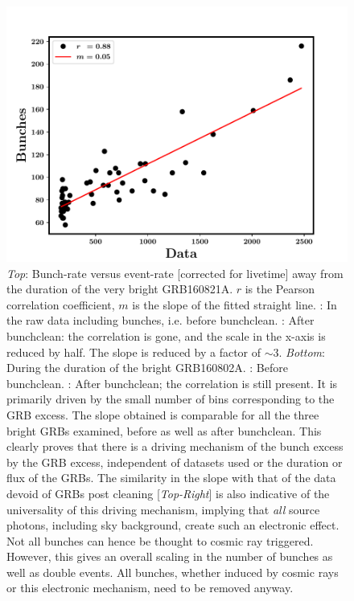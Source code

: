 \begin{figure}
\begin{center}
\includegraphics[scale=0.4]{GRB160802A--GRB_fit--with_Bunchclean}
\caption[Correlation between bunch-rate and event-rate]{\emph{Top}: Bunch-rate versus event-rate [corrected for livetime] away from the duration of the very bright GRB160821A. $r$ is the Pearson correlation coefficient, $m$ is the slope of the fitted straight line. \eL: In the raw data including bunches, i.e. before bunchclean. \eR: After bunchclean: the correlation is gone, and the scale in the x-axis is reduced by half. The slope is reduced by a factor of $\sim 3$. \emph{Bottom}: During the duration of the bright GRB160802A. \eL: Before bunchclean. \eR: After bunchclean; the correlation is still present. It is primarily driven by the small number of bins corresponding to the GRB excess. The slope obtained is comparable for all the three bright GRBs examined, before as well as after bunchclean. This clearly proves that there is a driving mechanism of the bunch excess by the GRB excess, independent of datasets used or the duration or flux of the GRBs. The similarity in the slope with that of the data devoid of GRBs post cleaning [\emph{Top-Right}] is also indicative of the universality of this driving mechanism, implying that \emph{all} source photons, including sky background, create such an electronic effect. Not all bunches can hence be thought to cosmic ray triggered. However, this gives an overall scaling in the number of bunches as well as double events. All bunches, whether induced by cosmic rays or this electronic mechanism, need to be removed anyway.}
\label{fig:correlations}
\end{center}
\end{figure}


